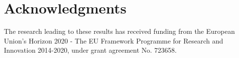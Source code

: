 \section*{Acknowledgments}\label{sec:acknowledgments}

The research leading to these results has received funding from the European Union’s Horizon 2020 - The EU Framework Programme for Research and Innovation 2014-2020, under grant agreement No. 723658.
